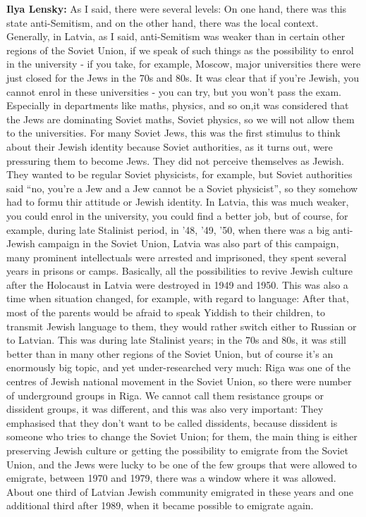 \textbf{Ilya Lensky:} As I said, there were several levels: On one hand, there was this state anti-Semitism, and on the other hand, there was the local context. Generally, in Latvia, as I said, anti-Semitism was weaker than in certain other regions of the Soviet Union, if we speak of such things as the possibility to enrol in the university - if you take, for example, Moscow, major universities there were just closed for the Jews in the 70s and 80s. It was clear that if you’re Jewish, you cannot enrol in these universities - you can try, but you won’t pass the exam. Especially in departments like maths, physics, and so on,it was considered that the Jews are dominating Soviet maths, Soviet physics, so we will not allow them to the universities. For many Soviet Jews, this was the first stimulus to think about their Jewish identity because Soviet authorities, as it turns out, were pressuring them to become Jews. They did not perceive themselves as Jewish. They wanted to be regular Soviet physicists, for example, but Soviet authorities said ``no, you’re a Jew and a Jew cannot be a Soviet physicist'', so they somehow had to formu thir attitude or Jewish identity. In Latvia, this was much weaker, you could enrol in the university, you could find a better job, but of course, for example, during late Stalinist period, in '48, '49, '50, when there was a big anti-Jewish campaign in the Soviet Union, Latvia was also part of this campaign, many prominent intellectuals were arrested and imprisoned, they spent several years in prisons or camps. Basically, all the possibilities to revive  Jewish culture after the Holocaust in Latvia were destroyed in 1949 and 1950. This was also a time when situation changed, for example, with regard to language: After that, most of the parents would be afraid to speak Yiddish to their children, to transmit Jewish language to them, they would rather switch either to Russian or to Latvian. This was during late Stalinist years; in the 70s and 80s, it was still better than in many other regions of the Soviet Union, but of course it’s an enormously big topic, and yet under-researched very much: Riga was one of the centres of Jewish national movement in the Soviet Union, so there were number of underground groups in Riga. We cannot call them resistance groups or dissident groups, it was different, and this was also very important: They emphasised that they don’t want to be called dissidents, because dissident is someone who tries to change the Soviet Union; for them, the main thing is either preserving Jewish culture or getting the possibility to emigrate from the Soviet Union, and the Jews were lucky to be one of the few groups that were allowed to emigrate, between 1970 and 1979, there was a window where it was allowed. About one third of Latvian Jewish community emigrated in these years and one additional third after 1989, when it became possible to emigrate again. 

